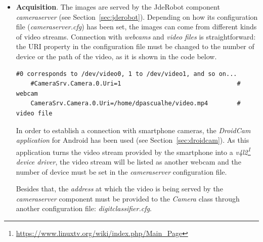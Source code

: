 \begin{itemize}
	\item \textbf{Acquisition}. The images are served by the JdeRobot component \emph{\textit{cameraserver}} (see Section~\ref{sec:jderobot}). Depending on how its configuration file (\textit{cameraserver.cfg}) has been set, the images can come from different kinds of video streams. Connection with \emph{webcams} and \emph{video files} is straightforward: the URI property in the configuration file must be changed to the number of device or the path of the video, as it is shown in the code below.
	\begin{lstlisting}[frame=single]
	#0 corresponds to /dev/video0, 1 to /dev/video1, and so on...
	#CameraSrv.Camera.0.Uri=1                                # webcam
	CameraSrv.Camera.0.Uri=/home/dpascualhe/video.mp4        # video file
	\end{lstlisting}
	
	In order to establish a connection with smartphone cameras, the \emph{DroidCam application} for Android has been used (see Section~\ref{sec:droidcam}). As this application turns the video stream provided by the smartphone into a \emph{v4l2\footnote{\url{https://www.linuxtv.org/wiki/index.php/Main_Page}} device driver}, the video stream will be listed as another webcam and the number of device must be set in the \textit{cameraserver} configuration file.
	
	Besides that, the \emph{address} at which the video is being served by the \textit{cameraserver} component must be provided to the \textit{Camera} class through another configuration file: \emph{\textit{digitclassifier.cfg}}.
	

\end{itemize}
